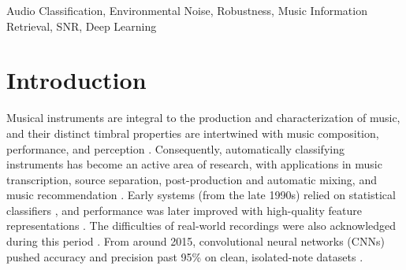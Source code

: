 \documentclass[conference]{IEEEtran}
\begin{document}
\maketitle

\begin{abstract}
Instrument classification underpins Music Information Retrieval (MIR) and supports musicology, audio editing, and transcription. Models that perform well on clean recordings may lose substantial accuracy under noise, yet robustness is rarely compared across model families. We construct a reproducible noise-robustness benchmark for instrument classification---12 orchestral instruments from the Philharmonia Orchestra Sound Samples dataset, perturbed by white (Gaussian), human non-speech (ESC-50), and environmental (DEMAND) noise at SNRs from 50 dB to $-$10 dB---and evaluate six systems on it, three trained from scratch (SVM, CNN, CRNN) and three pretrained (AST, MERT, and PANNs). Every mixture regenerates exactly from a fixed seed, so all six are scored on identical audio and every comparison is paired. Clean macro-F1 spanned only 0.971 to 0.991, but models retained just 26--64\% of it under white noise, 65--79\% under human non-speech, and 51--75\% under environmental noise; the first two ranges do not overlap, so no choice of model compensated for the change in noise category. AST was the most robust under all three categories and the only model to hold its rank. Clean accuracy is therefore not indicative of robustness, and degradation depends on noise category rather than severity alone---a dependence that survives measuring each category's power in the instrument band. Failures were structured rather than diffuse: instrument pairs closer together in an 88-dimensional feature space were confused more heavily as noise rose, in 17 of 18 predeclared model-by-noise tests.
\end{abstract}

\begin{IEEEkeywords}
Audio Classification, Environmental Noise, Robustness, Music Information Retrieval, SNR, Deep Learning
\end{IEEEkeywords}

\section{Introduction}
Musical instruments are integral to the production and characterization of music, and their distinct timbral properties are intertwined with music composition, performance, and perception \cite{b1}. Consequently, automatically classifying instruments has become an active area of research, with applications in music transcription, source separation, post-production and automatic mixing, and music recommendation \cite{b2}. Early systems (from the late 1990s) relied on statistical classifiers \cite{b3}, and performance was later improved with high-quality feature representations \cite{b4}. The difficulties of real-world recordings were also acknowledged during this period \cite{b5}. From around 2015, convolutional neural networks (CNNs) pushed accuracy and precision past 95\% on clean, isolated-note datasets \cite{b6,b7,b8}.
\end{document}
